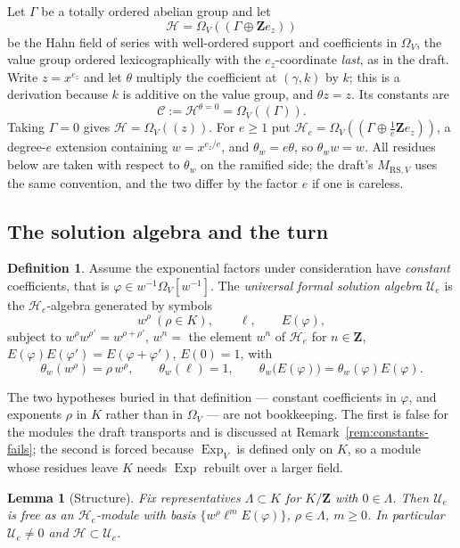 \documentclass[11pt]{article}
\newtheorem{lemma}[theorem]{Lemma}
\theoremstyle{definition}
\newtheorem{definition}[theorem]{Definition}
\theoremstyle{remark}
\newcommand{\Z}{\mathbf Z}
\begin{document}
Let $\Gamma$ be a totally ordered abelian group and let
\[
  \mathcal H=\Omega_V(\!(\Gamma\oplus\Z e_z)\!)
\]
be the Hahn field of series with well-ordered support and coefficients in
$\Omega_V$, the value group ordered lexicographically with the $e_z$-coordinate
\emph{last}, as in the draft. Write $z=x^{e_z}$ and let $\theta$ multiply the
coefficient at $(\gamma,k)$ by $k$; this is a derivation because $k$ is additive
on the value group, and $\theta z=z$. Its constants are
\[
  \mathcal C:=\mathcal H^{\theta=0}=\Omega_V(\!(\Gamma)\!).
\]
Taking $\Gamma=0$ gives $\mathcal H=\Omega_V(\!(z)\!)$. For $e\ge1$ put
$\mathcal H_e=\Omega_V(\!(\Gamma\oplus\frac1e\Z e_z)\!)$, a degree-$e$ extension
containing $w=x^{e_z/e}$, and $\theta_w=e\theta$, so $\theta_ww=w$. All residues
below are taken with respect to $\theta_w$ on the ramified side; the draft's
$M_{\mathrm{RS},V}$ uses the same convention, and the two differ by the factor
$e$ if one is careless.

\subsection*{The solution algebra and the turn}

\begin{definition}
\label{def:solution-algebra}
Assume the exponential factors under consideration have \emph{constant}
coefficients, that is $\varphi\in w^{-1}\Omega_V[w^{-1}]$. The \emph{universal
formal solution algebra} $\mathcal U_e$ is the $\mathcal H_e$-algebra generated
by symbols
\[
  w^\rho\ (\rho\in K),\qquad \ell,\qquad E(\varphi),
\]
subject to $w^\rho w^{\rho'}=w^{\rho+\rho'}$, $w^n=$ the element $w^n$ of
$\mathcal H_e$ for $n\in\Z$, $E(\varphi)E(\varphi')=E(\varphi+\varphi')$,
$E(0)=1$, with
\[
  \theta_w(w^\rho)=\rho\,w^\rho,\qquad
  \theta_w(\ell)=1,\qquad
  \theta_w\bigl(E(\varphi)\bigr)=\theta_w(\varphi)E(\varphi).
\]
\end{definition}

The two hypotheses buried in that definition --- constant coefficients in
$\varphi$, and exponents $\rho$ in $K$ rather than in $\Omega_V$ --- are not
bookkeeping. The first is false for the modules the draft transports and is
discussed at Remark~\ref{rem:constants-fails}; the second is forced because
$\operatorname{Exp}_V$ is defined only on $K$, so a module whose residues leave
$K$ needs $\operatorname{Exp}$ rebuilt over a larger field.

\begin{lemma}[Structure]
\label{lem:structure}
Fix representatives $\Lambda\subset K$ for $K/\Z$ with $0\in\Lambda$. Then
$\mathcal U_e$ is free as an $\mathcal H_e$-module with basis
$\{w^\rho\ell^mE(\varphi)\}$, $\rho\in\Lambda$, $m\ge0$. In particular
$\mathcal U_e\ne0$ and $\mathcal H\subset\mathcal U_e$.
\end{lemma}
\end{document}
